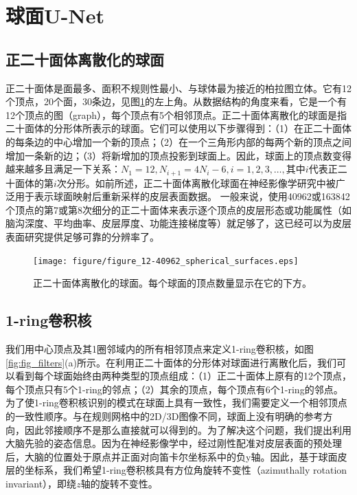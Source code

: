 \section{球面U-Net}\label{sec:球面U-Net}
\subsection{正二十面体离散化的球面}\label{sec:正二十面体离散化的球面}
正二十面体是面最多、面积不规则性最小、与球体最为接近的柏拉图立体\cite{PlatonicSolid}。它有12个顶点，20个面，30条边，见图\ref{fig:figure_12-40962_spherical_surfaces}的左上角。从数据结构的角度来看，它是一个有12个顶点的图（graph），每个顶点有5个相邻顶点。正二十面体离散化的球面是指二十面体的分形体所表示的球面。它们可以使用以下步骤得到：（1）在正二十面体的每条边的中心增加一个新的顶点；（2）在一个三角形内部的每两个新的顶点之间增加一条新的边；（3）将新增加的顶点投影到球面上。因此，球面上的顶点数变得越来越多且满足一下关系：$N_1=12,N_{i+1}=4N_i-6,i=1,2,3,\dots,$其中$i$代表正二十面体的第$i$次分形。如前所述，正二十面体离散化球面在神经影像学研究中被广泛用于表示球面映射后重新采样的皮层表面数据\cite{fischl2012freesurfer}。
一般来说，使用40962或163842个顶点的第7或第8次细分的正二十面体来表示逐个顶点的皮层形态或功能属性（如脑沟深度、平均曲率、皮层厚度、功能连接梯度等）就足够了，这已经可以为皮层表面研究提供足够可靠的分辨率了。

\begin{figure}[t]
    \centering
    \texttt{[image: figure/figure\_12-40962\_spherical\_surfaces.eps]}
    \caption{\label{fig:figure_12-40962_spherical_surfaces}正二十面体离散化的球面。每个球面的顶点数量显示在它的下方。}
\end{figure}


\subsection{1-ring卷积核}\label{sec:1-ring卷积核}
我们用中心顶点及其1圈邻域内的所有相邻顶点来定义1-ring卷积核，如图\ref{fig:fig_filters}(a)所示。在利用正二十面体的分形体对球面进行离散化后，我们可以看到每个球面始终由两种类型的顶点组成：（1）正二十面体上原有的12个顶点，每个顶点只有5个1-ring的邻点；（2）其余的顶点，每个顶点有6个1-ring的邻点。为了使1-ring卷积核识别的模式在球面上具有一致性，我们需要定义一个相邻顶点的一致性顺序。与在规则网格中的2D/3D图像不同，球面上没有明确的参考方向，因此邻接顺序不是那么直接就可以得到的。为了解决这个问题，我们提出利用大脑先验的姿态信息。因为在神经影像学中，经过刚性配准\cite{greve2009accurate}对皮层表面的预处理后，大脑的位置处于原点并正面对向笛卡尔坐标系中的负y轴。因此，基于球面皮层的坐标系，我们希望1-ring卷积核具有方位角旋转不变性（azimuthally rotation invariant），即绕$z$轴的旋转不变性。

